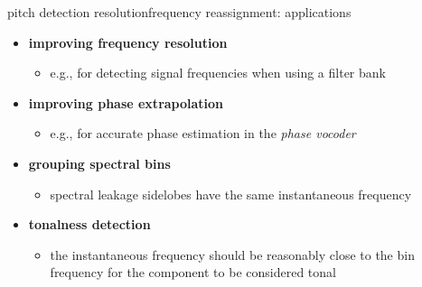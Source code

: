         \begin{frame}{pitch detection resolution}{frequency reassignment: applications}
            \begin{itemize}
                \item \textbf{improving frequency resolution}
                    \begin{itemize}
                        \item e.g., for detecting signal frequencies when using a filter bank
                    \end{itemize}
                \bigskip
                \item<2-> \textbf{improving phase extrapolation}
                    \begin{itemize}
                        \item e.g., for accurate phase estimation in the \textit{phase vocoder}
                    \end{itemize}
                \bigskip
                \item<3-> \textbf{grouping spectral bins}
                    \begin{itemize}
                        \item spectral leakage sidelobes have the same instantaneous frequency
                    \end{itemize}
                \bigskip
                \item<4-> \textbf{tonalness detection}
                    \begin{itemize}
                        \item   the instantaneous frequency should be reasonably close to the bin frequency for the component to be considered tonal
                    \end{itemize}
            \end{itemize}
        \end{frame}
        
